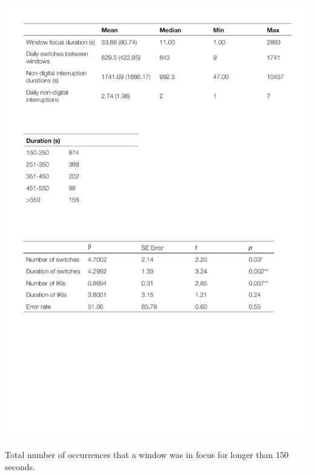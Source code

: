 \begin{table}
\centering
\centerline{\includegraphics[scale=0.8]{images/ch56/ch56_LongWindowDurations.pdf}}
\caption[Study 7 frequency of long window durations]{Total number of occurrences that a window was in focus for longer than 150 seconds.}
\label{tbl:ch56-tblwindowdurations}
\end{table}

